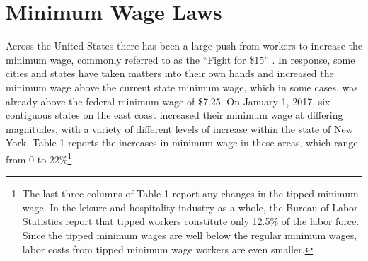 \documentclass[11pt]{article}
\begin{document}






\section{Minimum Wage Laws}

Across the United States there has been a large push from workers to increase the minimum wage, commonly referred to as the ``Fight for \$15'' \cite{ff15}. In response, some cities and states have taken matters into their own hands and increased the minimum wage above the current state minimum wage, which in some cases, was already above the federal minimum wage of \$7.25. On January 1, 2017, six contiguous states on the east coast increased their minimum wage at differing magnitudes, with a variety of different levels of increase within the state of New York. Table 1 reports the increases in minimum wage in these areas, which range from 0 to 22\%\footnote{The last three columns of Table 1 report any changes in the tipped minimum wage. In the leisure and hospitality industry as a whole, the Bureau of Labor Statistics report that tipped workers constitute only 12.5\% of the labor force. Since the tipped minimum wages are well below the regular minimum wages, labor costs from tipped minimum wage workers are even smaller.}
\end{document}
